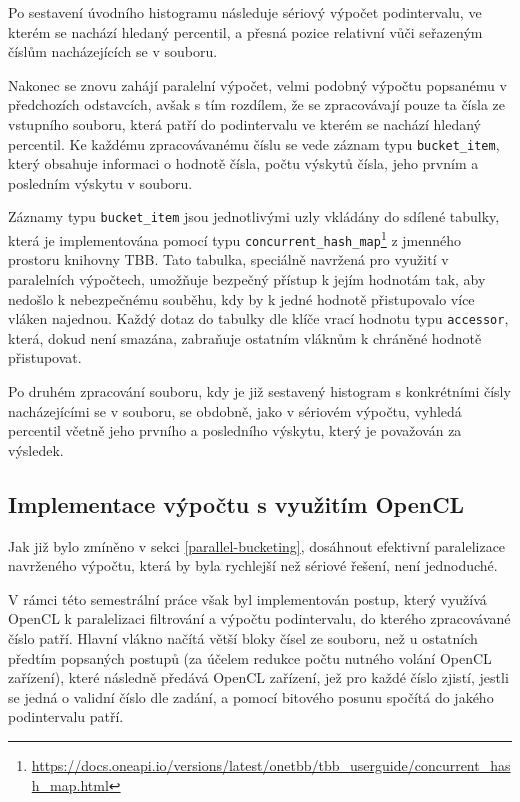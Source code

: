 \documentclass[12pt, a4paper]{article}
\begin{document}
Po sestavení úvodního histogramu následuje sériový výpočet podintervalu, ve kterém se nachází hledaný percentil, a přesná pozice relativní vůči seřazeným číslům nacházejících se v souboru.

Nakonec se znovu zahájí paralelní výpočet, velmi podobný výpočtu popsanému v předchozích odstavcích, avšak s tím rozdílem, že se zpracovávají pouze ta čísla ze vstupního souboru, která patří do podintervalu ve kterém se nachází hledaný percentil.
Ke každému zpracovávanému číslu se vede záznam typu \texttt{bucket\_item}, který obsahuje informaci o hodnotě čísla, počtu výskytů čísla, jeho prvním a posledním výskytu v souboru.

Záznamy typu \texttt{bucket\_item} jsou jednotlivými uzly vkládány do sdílené tabulky, která je implementována pomocí typu \texttt{concurrent\_hash\_map}\footnote{\url{https://docs.oneapi.io/versions/latest/onetbb/tbb_userguide/concurrent_hash_map.html}} z jmenného prostoru knihovny TBB.
Tato tabulka, speciálně navržená pro využití v paralelních výpočtech, umožňuje bezpečný přístup k jejím hodnotám tak, aby nedošlo k nebezpečnému souběhu, kdy by k jedné hodnotě přistupovalo více vláken najednou.
Každý dotaz do tabulky dle klíče vrací hodnotu typu \texttt{accessor}, která, dokud není smazána, zabraňuje ostatním vláknům k chráněné hodnotě přistupovat.

Po druhém zpracování souboru, kdy je již sestavený histogram s konkrétními čísly nacházejícími se v souboru, se obdobně, jako v sériovém výpočtu, vyhledá percentil včetně jeho prvního a posledního výskytu, který je považován za výsledek.

\subsection{Implementace výpočtu s využitím OpenCL}
Jak již bylo zmíněno v sekci \ref{parallel-bucketing}, dosáhnout efektivní paralelizace navrženého výpočtu, která by byla rychlejší než sériové řešení, není jednoduché.

V rámci této semestrální práce však byl implementován postup, který využívá OpenCL k paralelizaci filtrování a výpočtu podintervalu, do kterého zpracovávané číslo patří.
Hlavní vlákno načítá větší bloky čísel ze souboru, než u ostatních předtím popsaných postupů (za účelem redukce počtu nutného volání OpenCL zařízení), které následně předává OpenCL zařízení, jež pro každé číslo zjistí, jestli se jedná o validní číslo dle zadání, a pomocí bitového posunu spočítá do jakého podintervalu patří. 
\end{document}
